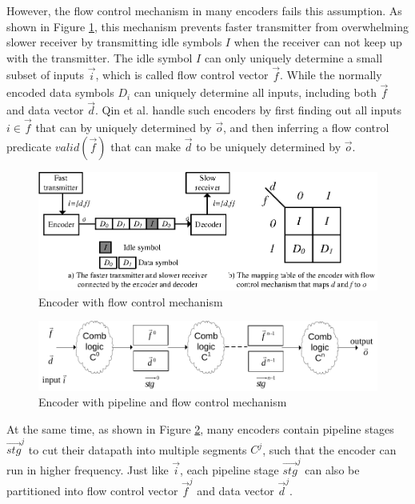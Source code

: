 \documentclass[runningheads,a4paper,orivec]{llncs}
\begin{document}
However,
the flow control mechanism \cite{flowcontrol} in many encoders
fails this assumption.
As shown in Figure \ref{fig_fc},
this mechanism prevents faster transmitter from overwhelming slower receiver
by transmitting idle symbols $I$ when the receiver can not keep up with the transmitter.
The idle symbol $I$
can only uniquely determine a small subset of inputs $\vec{i}$,
which is called flow control vector $\vec{f}$.
While the normally encoded data symbols $D_i$ can
uniquely determine all inputs, 
including both $\vec{f}$ and data vector $\vec{d}$.
Qin et al. \cite{QinTODAES15} handle such encoders by
first finding out all inputs $i\in\vec{f}$ that can by uniquely determined by $\vec{o}$,
and then inferring a flow control predicate $valid(\vec{f})$ that
can make $\vec{d}$ to be uniquely determined by $\vec{o}$.

\begin{figure}[t]
\centering
\includegraphics[width=\textwidth]{nonuniq}
\caption{Encoder with flow control mechanism}
\label{fig_fc}
\end{figure}

\begin{figure}[b]
\centering
\includegraphics[width=\textwidth]{pipemod1}
\caption{Encoder with pipeline and flow control mechanism}
\label{pipemod}
\end{figure}



At the same time,
as shown in Figure \ref{pipemod},
many encoders contain
pipeline stages $\vec{stg}^j$ to cut their datapath into multiple segments $C^j$,
such that the encoder can run in higher frequency.
Just like $\vec{i}$,
each pipeline stage $\vec{stg}^j$ can also be partitioned into flow control vector $\vec{f}^j$ and data vector $\vec{d}^j$.
\end{document}
